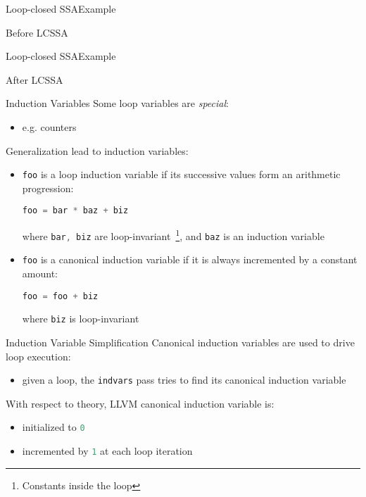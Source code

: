\documentclass[10pt,mathserif]{beamer}
\newcommand{\cinline}[1]{\lstinline[language=C]!#1!}
\newcommand{\llvminput}[1]{}
\newcommand{\llvminline}[1]{\lstinline[language=LLVM]!#1!}
\begin{document}
\begin{frame}{Loop-closed SSA}{Example}
\begin{block}{Before LCSSA}
\centering
\llvminput{snippet/02/before-lcssa.ll}
\end{block}
\vspace{\baselineskip}
\vfill
\end{frame}

\begin{frame}{Loop-closed SSA}{Example}
\begin{block}{After LCSSA}
\centering
\llvminput{snippet/02/after-lcssa.ll}
\end{block}
\vfill
\end{frame}

\begin{frame}{Induction Variables}
Some loop variables are \emph{special}:

\begin{itemize}
\item e.g. counters
\end{itemize}

\vfill
Generalization lead to \alert{induction variables}:

\begin{itemize}
\item \cinline{foo} is a loop induction variable if its successive values form
      an arithmetic progression:

      \begin{center}
      \cinline{foo = bar * baz + biz}
      \end{center}

      where \cinline{bar, biz} are
      loop-invariant~\footnote{Constants inside the loop}, and \cinline{baz} is
      an induction variable
\item \cinline{foo} is a \alert{canonical} induction variable if it is always
      incremented by a constant amount:

      \begin{center}
      \cinline{foo = foo + biz}
      \end{center}

      where \cinline{biz} is loop-invariant
\end{itemize}
\end{frame}

\begin{frame}{Induction Variable Simplification}
Canonical induction variables are used to \alert{drive} loop execution:

\begin{itemize}
\item given a loop, the \texttt{indvars} pass tries to find its canonical
      induction variable
\end{itemize}

\vfill
With respect to theory, LLVM canonical induction variable is:

\begin{itemize}
\item initialized to \llvminline{0}
\item incremented by \llvminline{1} at each loop iteration
\end{itemize}
\end{frame}
\end{document}
